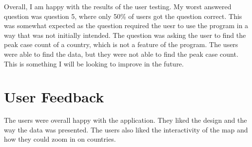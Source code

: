 \documentclass{report}
\begin{document}
\newpage
Overall, I am happy with the results of the user testing. My worst answered question was question 5, where only 50\% of users got the question correct. This was somewhat expected as the question required the uesr to use the program in a way that was not initially intended. The question was asking the user to find the peak case count of a country, which is not a feature of the program. The users were able to find the data, but they were not able to find the peak case count. This is something I will be looking to improve in the future.

\section{User Feedback}
The users were overall happy with the application. They liked the design and the way the data was presented. The users also liked the interactivity of the map and how they could zoom in on countries.\\
\end{document}
